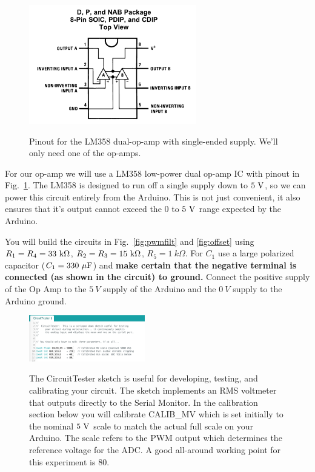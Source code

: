 \documentclass[12pt]{article}
\begin{document}
\begin{figure}[htbp]
\begin{center}
{\includegraphics[width=0.65\textwidth]{figs/lm358.png}}
\end{center}
\caption{\label{fig:lm358} Pinout for the LM358 dual-op-amp with single-ended supply.  We'll only need one of the op-amps.}
\end{figure}

For our op-amp we will use a LM358 low-power dual op-amp IC with pinout in Fig.~\ref{fig:lm358}.
The LM358 is designed to run off a single supply down to $5~\rm V$, so we can power this circuit entirely from the Arduino.  This is not just convenient, it also ensures that it's output cannot exceed the $0$ to $5~\rm V$ range expected by the Arduino.

You will build the circuits in Fig.~\ref{fig:pwmfilt}  and \ref{fig:offset} using $R_1 = R_4 = 33~\rm k\Omega$, $R_2 = R_3 = 15~\rm k\Omega$, $R_5=1~k\Omega$.  For $C_1$ use a large polarized capacitor ($C_1=330~\rm  \mu F$) and {\bf make certain that the negative terminal is connected (as shown in the circuit) to ground.}  Connect the positive supply of the Op Amp to the $5~V$ supply of the Arduino and the $0~V$ supply to the Arduino ground.  

\begin{figure}[htbp]
\begin{center}
{\includegraphics[width=0.45\textwidth]{figs/test_circuit.png}}\\
\end{center}
\caption{\label{fig:sketches}  The CircuitTester sketch is useful for developing, testing, and calibrating your circuit.  The sketch implements an RMS voltmeter that outputs directly to the Serial Monitor.  In the calibration section below you will calibrate CALIB\_MV which is set initially to the nominal $5~\rm V$ scale to match the actual full scale on your Arduino.  The scale refers to the PWM output which determines the reference voltage for the ADC.  A good all-around working point for this experiment is 80.}
\end{figure}
\end{document}
